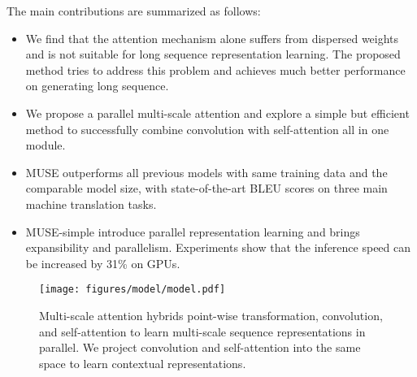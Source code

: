 \documentclass{article} \usepackage{iclr2020_conference,times}
\begin{document}
The main contributions are summarized as follows:
\begin{itemize}

\item We find that the attention mechanism alone suffers from dispersed weights and is not suitable for long sequence representation learning. The proposed method tries to address this problem and achieves much better performance on generating long sequence.

\item We propose a parallel multi-scale attention and explore a simple but efficient method to successfully combine convolution with self-attention all in one module. 


\item MUSE outperforms all previous models with same training data and the comparable model size, with state-of-the-art BLEU scores on three main machine translation tasks. 

\item MUSE-simple introduce parallel representation learning  and brings expansibility and parallelism. Experiments show that the inference speed can be increased by 31\% on GPUs.
\end{itemize}









































\begin{figure}[t]
\centering
\texttt{[image: figures/model/model.pdf]}
\caption{Multi-scale attention hybrids point-wise  transformation, convolution, and self-attention to learn multi-scale sequence representations in parallel. We project convolution and self-attention into the same space to learn contextual representations.}
\label{fig:ffn_conv}
\end{figure}
\end{document}

